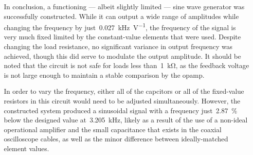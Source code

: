 In conclusion, a functioning --- albeit slightly limited --- sine wave
generator was successfully constructed.  While it can output a wide range of
amplitudes while changing the frequency by
just~\SI{0.027}{\kilo\hertz\per\volt}, the frequency of the signal is very much
fixed limited by the constant-value elements that were used.  Despite changing
the load resistance, no significant variance in output frequency was achieved,
though this did serve to modulate the output amplitude.  It should be noted
that the circuit is not safe for loads less than~\SI{1}{\kilo\ohm}, as the
feedback voltage is not large enough to maintain a stable comparison by the
opamp.

In order to vary the frequency, either all of the capcitors or all of the
fixed-value resistors in this circuit would need to be adjusted simultaneously.
However, the constructed system produced a sinusoidal signal with a frequency
just~\SI{2.87}{\percent} below the designed value at~\SI{3.205}{\kilo\hertz},
likely as a result of the use of a non-ideal operational amplifier and the
small capacitance that exists in the coaxial oscilloscope cables, as well as
the minor difference between ideally-matched element values.
